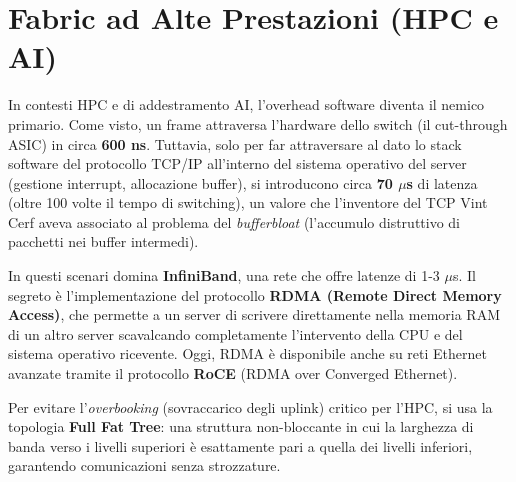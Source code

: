 \section{Fabric ad Alte Prestazioni (HPC e AI)}
In contesti HPC e di addestramento AI, l'overhead software diventa il nemico primario. Come visto, un frame attraversa l'hardware dello switch (il cut-through ASIC) in circa \textbf{600 ns}. Tuttavia, solo per far attraversare al dato lo stack software del protocollo TCP/IP all'interno del sistema operativo del server (gestione interrupt, allocazione buffer), si introducono circa \textbf{70 $\mu$s} di latenza (oltre 100 volte il tempo di switching), un valore che l'inventore del TCP Vint Cerf aveva associato al problema del \textit{bufferbloat} (l'accumulo distruttivo di pacchetti nei buffer intermedi).

In questi scenari domina \textbf{InfiniBand}, una rete che offre latenze di 1-3 $\mu$s. Il segreto è l'implementazione del protocollo \textbf{RDMA (Remote Direct Memory Access)}, che permette a un server di scrivere direttamente nella memoria RAM di un altro server scavalcando completamente l'intervento della CPU e del sistema operativo ricevente.
Oggi, RDMA è disponibile anche su reti Ethernet avanzate tramite il protocollo \textbf{RoCE} (RDMA over Converged Ethernet).

\begin{definitionbox}
Per evitare l'\textit{overbooking} (sovraccarico degli uplink) critico per l'HPC, si usa la topologia \textbf{Full Fat Tree}: una struttura non-bloccante in cui la larghezza di banda verso i livelli superiori è esattamente pari a quella dei livelli inferiori, garantendo comunicazioni senza strozzature.
\end{definitionbox}
